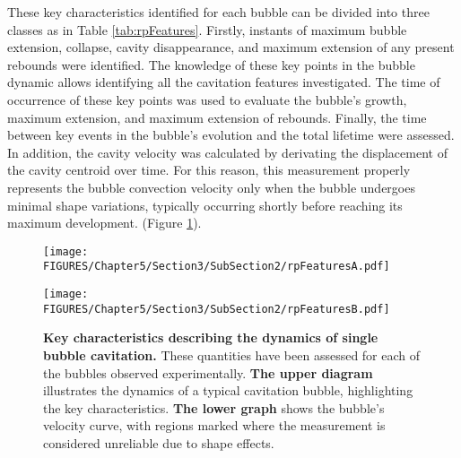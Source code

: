 These key characteristics identified for each bubble can be divided into three classes as in Table \ref{tab:rpFeatures}.
Firstly, instants of maximum bubble extension, collapse, cavity disappearance, and maximum extension of any present rebounds were identified. The knowledge of these key points in the bubble dynamic allows identifying all the cavitation features investigated.
The time of occurrence of these key points was used to evaluate the bubble's growth, maximum extension, and maximum extension of rebounds. 
Finally, the time between key events in the bubble's evolution and the total lifetime were assessed.
In addition, the cavity velocity was calculated by derivating the displacement of the cavity centroid over time.
For this reason, this measurement properly represents the bubble convection velocity only when the bubble undergoes minimal shape variations, typically occurring shortly before reaching its maximum development. (Figure \ref{fig:rpFeatures}). 

\begin{center}
\end{center}


\begin{figure}[h!]
    \centering
    \begin{minipage}{\textwidth}
        \centering
        \texttt{[image: FIGURES/Chapter5/Section3/SubSection2/rpFeaturesA.pdf]} 
    \end{minipage}
    \vspace{0cm}
    \begin{minipage}{\textwidth}
        \centering
        \texttt{[image: FIGURES/Chapter5/Section3/SubSection2/rpFeaturesB.pdf]} 
    \end{minipage}
    \caption{\textbf{Key characteristics describing the dynamics of single bubble cavitation.} These quantities have been assessed for each of the bubbles observed experimentally.
    \textbf{The upper diagram} illustrates the dynamics of a typical cavitation bubble, highlighting the key characteristics. \textbf{The lower graph} shows the bubble's velocity curve, with regions marked where the measurement is considered unreliable due to shape effects.}
    \label{fig:rpFeatures}
\end{figure}

